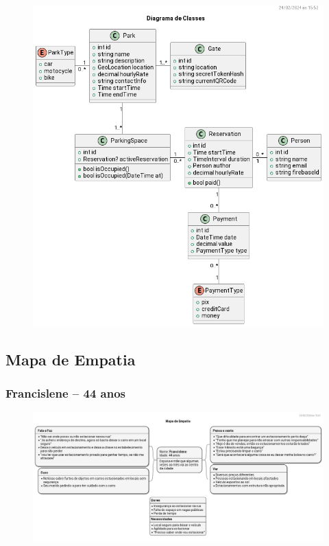 \documentclass[a4paper,12pt]{article}
\begin{document}
\begin{figure}[htbp]
    \centerline{\includegraphics[width=\linewidth]{build/diagrama_de_classe.png}}
\end{figure}

\subsection{Mapa de Empatia}

\subsubsection{Francislene -- 44 anos}
\begin{figure}[htbp]
    \centerline{\includegraphics[width=\linewidth]{build/mapa_de_empatia_1_fran.png}}
\end{figure}


 \newpage
 
 
\end{document}
